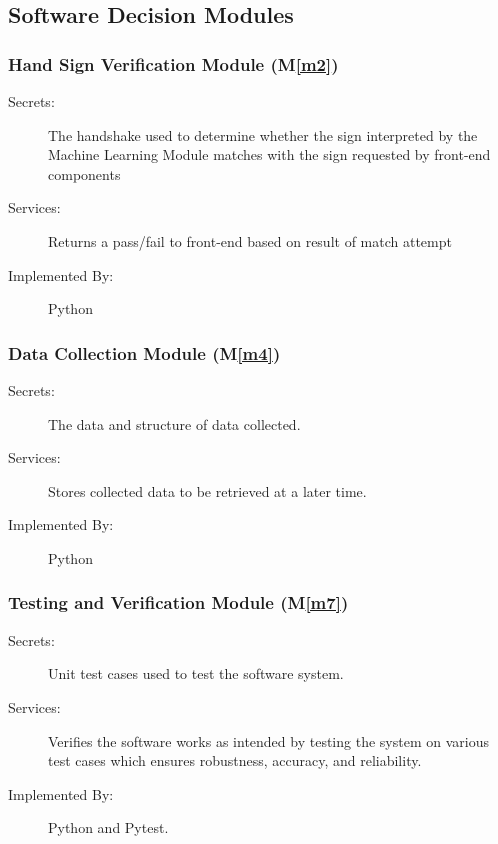 \documentclass[12pt, titlepage]{article}
\newcommand{\mref}[1]{M\ref{#1}}
\begin{document}
\subsection{Software Decision Modules}


\subsubsection{Hand Sign Verification Module (\mref{m2})}
\begin{description}
\item[Secrets:] The handshake used to determine whether the sign interpreted by the Machine Learning Module matches with the sign requested by front-end components
\item[Services:] Returns a pass/fail to front-end based on result of match attempt
\item[Implemented By:] Python
\end{description}

\subsubsection{Data Collection Module (\mref{m4})}

\begin{description}
\item[Secrets:] The data and structure of data collected.
\item[Services:] Stores collected data to be retrieved at a later time.
\item[Implemented By:] Python
\end{description}

\subsubsection{Testing and Verification Module (\mref{m7})}
\begin{description}
\item[Secrets:] Unit test cases used to test the software system.
\item[Services:] Verifies the software works as intended by testing the system on various test cases which ensures robustness, accuracy, and reliability.
\item[Implemented By:] Python and Pytest.
\end{description}
\end{document}
